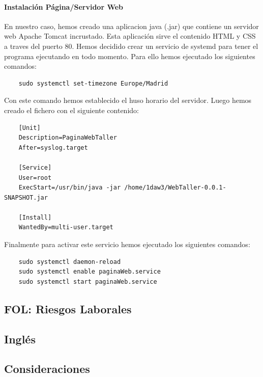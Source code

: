 \documentclass{article}
\begin{document}
{  \paragraph{Instalación Página/Servidor Web}
  En nuestro caso, hemos creado una aplicacion java (.jar) que contiene un servidor web Apache Tomcat incrustado. Esta 
  aplicación sirve el contenido HTML y CSS a traves del puerto 80. Hemos decidido crear un servicio de systemd para tener 
  el programa ejecutando en todo momento. Para ello hemos ejecutado los siguientes comandos: 
  \begin{lstlisting}
    sudo systemctl set-timezone Europe/Madrid
  \end{lstlisting}
  Con este comando hemos establecido el huso horario del servidor.
  Luego hemos creado el fichero  con el siguiente contenido: 
  \begin{lstlisting}
    [Unit]
    Description=PaginaWebTaller
    After=syslog.target

    [Service]
    User=root
    ExecStart=/usr/bin/java -jar /home/1daw3/WebTaller-0.0.1-SNAPSHOT.jar

    [Install]
    WantedBy=multi-user.target  
  \end{lstlisting}
  Finalmente para activar este servicio hemos ejecutado los siguientes comandos:
  \begin{lstlisting}
    sudo systemctl daemon-reload
    sudo systemctl enable paginaWeb.service
    sudo systemctl start paginaWeb.service
  \end{lstlisting}
}
\subsection{FOL: Riesgos Laborales}
\subsection{Inglés}
\subsection{Consideraciones}
\end{document}
